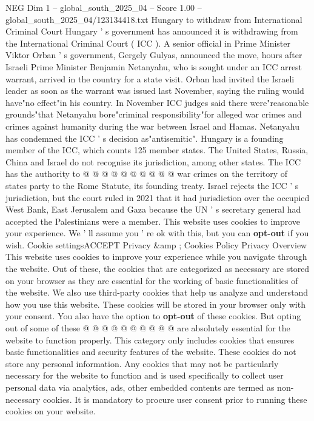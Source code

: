 \begin{textsample}{NEG Dim 1 – global\_south\_2025\_04 – Score 1.00 – global\_south\_2025\_04/123134418.txt}  \label{ex:f1_neg_163}
Hungary to withdraw from International Criminal Court Hungary ' s government has announced it is withdrawing from the International Criminal Court ( ICC ).
A senior official in Prime Minister Viktor Orban ' s government, Gergely Gulyas, announced the move, hours after Israeli Prime Minister Benjamin Netanyahu, who is sought under an ICC arrest warrant, arrived in the country for a state visit.
Orban had invited the Israeli leader as soon as the warrant was issued last November, saying the ruling would have"no effect"in his country.
In November ICC judges said there were"reasonable grounds"that Netanyahu bore"criminal responsibility"for alleged war crimes and crimes against humanity during the war between Israel and Hamas.
Netanyahu has condemned the ICC ' s decision as"antisemitic".
Hungary is a founding member of the ICC, which counts 125 member states.
The United States, Russia, China and Israel do not recognise its jurisdiction, among other states.
The ICC has the authority to @ @ @ @ @ @ @ @ @ @ war crimes on the territory of states party to the Rome Statute, its founding treaty.
Israel rejects the ICC ' s jurisdiction, but the court ruled in 2021 that it had jurisdiction over the occupied West Bank, East Jerusalem and Gaza because the UN ' s secretary general had accepted the Palestinians were a member.
This website uses cookies to improve your experience.
We ' ll assume you ' re ok with this, but you can \textbf{opt-out} if you wish.
Cookie settingsACCEPT Privacy \&amp ; Cookies Policy Privacy Overview This website uses cookies to improve your experience while you navigate through the website.
Out of these, the cookies that are categorized as necessary are stored on your browser as they are essential for the working of basic functionalities of the website.
We also use third-party cookies that help us analyze and understand how you use this website.
These cookies will be stored in your browser only with your consent.
You also have the option to \textbf{opt-out} of these cookies.
But opting out of some of these @ @ @ @ @ @ @ @ @ @ are absolutely essential for the website to function properly.
This category only includes cookies that ensures basic functionalities and security features of the website.
These cookies do not store any personal information.
Any cookies that may not be particularly necessary for the website to function and is used specifically to collect user personal data via analytics, ads, other embedded contents are termed as non-necessary cookies.
It is mandatory to procure user consent prior to running these cookies on your website.

\end{textsample}
